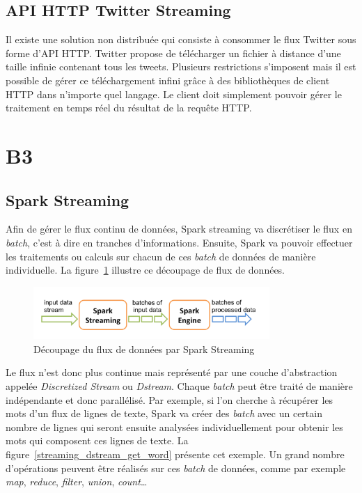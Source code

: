   \subsection{API HTTP Twitter Streaming}
  Il existe une solution non distribuée qui consiste à consommer le flux Twitter sous forme d'API HTTP. Twitter propose de télécharger un fichier à distance d'une taille infinie contenant tous les tweets. Plusieurs restrictions s'imposent mais il est possible de gérer ce téléchargement infini grâce à des bibliothèques de client HTTP dans n'importe quel langage. Le client doit simplement pouvoir gérer le traitement en temps réel du résultat de la requête HTTP.

\section{B3}
\label{sec:B3}
  \subsection{Spark Streaming}
    Afin de gérer le flux continu de données, Spark streaming va discrétiser le flux en \emph{batch}, c'est à dire en tranches d'informations. Ensuite, Spark va pouvoir effectuer les traitements ou calculs sur chacun de ces \emph{batch} de données de manière individuelle. La figure~\ref{streaming_flow} illustre ce découpage de flux de données. \\

  \begin{figure}
    \centering
    \includegraphics[width=0.8\textwidth]{images/streaming-flow.png}
    \caption{Découpage du flux de données par Spark Streaming}
    \label{streaming_flow}
  \end{figure}

  Le flux n'est donc plus continue mais représenté par une couche d'abstraction appelée \emph{Discretized Stream} ou \emph{Dstream}. Chaque \emph{batch} peut être traité de manière indépendante et donc parallélisé. Par exemple, si l'on cherche à récupérer les mots d'un flux de lignes de texte, Spark va créer des \emph{batch} avec un certain nombre de lignes qui seront ensuite analysées individuellement pour obtenir les mots qui composent ces lignes de texte. La figure~\ref{streaming_dstream_get_word} présente cet exemple. Un grand nombre d'opérations peuvent être réalisés sur ces \emph{batch} de données, comme par exemple \emph{map}, \emph{reduce}, \emph{filter}, \emph{union}, \emph{count}… \\

